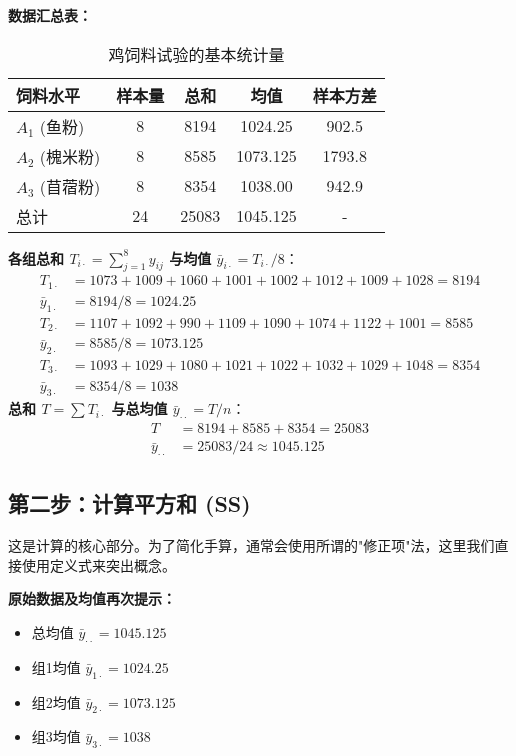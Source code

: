 \documentclass[12pt, a4paper]{amsart}
\begin{document}
\textbf{数据汇总表：}
\begin{table}[h!]
\centering
\caption{鸡饲料试验的基本统计量}
\begin{tabular}{lcccc}
\toprule
\textbf{饲料水平} & \textbf{样本量} & \textbf{总和} & \textbf{均值} & \textbf{样本方差} \\
\midrule
$A_1$ (鱼粉) & 8 & 8194 & 1024.25 & 902.5 \\
$A_2$ (槐米粉) & 8 & 8585 & 1073.125 & 1793.8 \\
$A_3$ (苜蓿粉) & 8 & 8354 & 1038.00 & 942.9 \\
\midrule
总计 & 24 & 25083 & 1045.125 & - \\
\bottomrule
\end{tabular}
\end{table}

\textbf{各组总和 $T_{i\cdot} = \sum_{j=1}^{8} y_{ij}$ 与均值 $\bar{y}_{i\cdot} = T_{i\cdot}/8$}：
\begin{align*}
    T_{1\cdot} &= 1073 + 1009 + 1060 + 1001 + 1002 + 1012 + 1009 + 1028 = 8194 \\
    \bar{y}_{1\cdot} &= 8194 / 8 = 1024.25 \\
    T_{2\cdot} &= 1107 + 1092 + 990 + 1109 + 1090 + 1074 + 1122 + 1001 = 8585 \\
    \bar{y}_{2\cdot} &= 8585 / 8 = 1073.125 \\
    T_{3\cdot} &= 1093 + 1029 + 1080 + 1021 + 1022 + 1032 + 1029 + 1048 = 8354 \\
    \bar{y}_{3\cdot} &= 8354 / 8 = 1038
\end{align*}
\textbf{总和 $T = \sum T_{i\cdot}$ 与总均值 $\bar{y}_{\cdot\cdot} = T/n$}：
\begin{align*}
    T &= 8194 + 8585 + 8354 = 25083 \\
    \bar{y}_{\cdot\cdot} &= 25083 / 24 \approx 1045.125
\end{align*}

\subsection{第二步：计算平方和 (SS)}
这是计算的核心部分。为了简化手算，通常会使用所谓的"修正项"法，这里我们直接使用定义式来突出概念。

\textbf{原始数据及均值再次提示：}
\begin{itemize}
    \item 总均值 $\bar{y}_{\cdot\cdot} = 1045.125$
    \item 组1均值 $\bar{y}_{1\cdot} = 1024.25$
    \item 组2均值 $\bar{y}_{2\cdot} = 1073.125$
    \item 组3均值 $\bar{y}_{3\cdot} = 1038$
\end{itemize}
\end{document}
